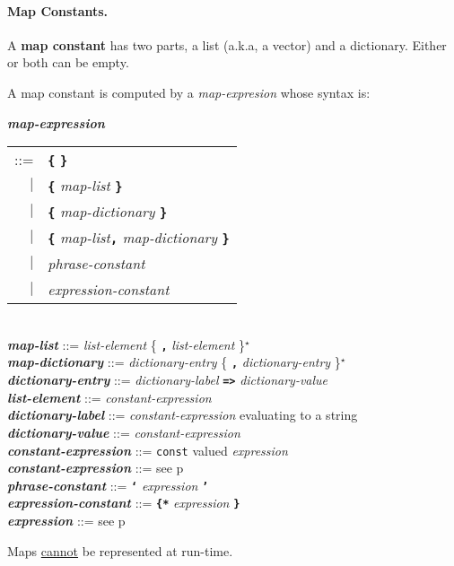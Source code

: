 \documentclass[12pt]{article}
\newcommand{\subsubsubsection}[1]{\paragraph[#1]{#1.}}
\newcommand{\TT}[1]{{\tt \bfseries #1}}
\newcommand{\STAR}{{\Large $^\star$}}
\newcommand{\key}[1]{{\rm \bfseries #1}}
\newcommand{\emkey}[1]{{\em \bfseries #1}}
\newcommand{\pagref}[1]{p\pageref{#1}}
\newenvironment{indpar}[1][0.3in]%
	{\begin{list}{}%
		     {\setlength{\itemsep}{0in}%
		      \setlength{\topsep}{0in}%
		      \setlength{\parsep}{1ex}%
		      \setlength{\labelwidth}{#1}%
		      \setlength{\leftmargin}{#1}%
		      \addtolength{\leftmargin}{\labelsep}}%
	 \item}%
	{\end{list}}
\begin{document}
\subsubsubsection{Map Constants}
\label{MAP-CONSTANTS}

A \key{map constant} has two parts, a list (a.k.a, a vector) and a dictionary.
Either or both can be empty.

A map constant is computed by a {\em map-expresion} whose syntax is:

\begin{indpar}
\emkey{map-expression}\label{MAP-EXPRESSION}
    \begin{tabular}[t]{rl}
    ::= & \TT{\{} \TT{\}} \\
    $|$ & \TT{\{} {\em map-list} \TT{\}} \\
    $|$ & \TT{\{} {\em map-dictionary} \TT{\}} \\
    $|$ & \TT{\{} {\em map-list}\TT{,} {\em map-dictionary} \TT{\}} \\
    $|$ & {\em phrase-constant} \\
    $|$ & {\em expression-constant} \\
    \end{tabular}
\\[0.5ex]
\emkey{map-list} ::= {\em list-element} \{ \TT{,} {\em list-element} \}\STAR{}
\\[0.5ex]
\emkey{map-dictionary} ::= {\em dictionary-entry}
                              \{ \TT{,} {\em dictionary-entry} \}\STAR{}
\\[0.5ex]
\emkey{dictionary-entry} ::=
    {\em dictionary-label} \TT{=>} {\em dictionary-value}
\\[0.5ex]
\emkey{list-element}\label{LIST-ELEMENT} ::= {\em constant-expression}
\\[0.5ex]
\emkey{dictionary-label}\label{DICTIONARY-LABEL}
    ::= {\em constant-expression} evaluating to a string
\\[0.5ex]
\emkey{dictionary-value}\label{DICTIONARY-VALUE}
    ::= {\em constant-expression}
\\[0.5ex]
\emkey{constant-expression}
    ::= {\tt const} valued {\em expression}
\\[0.5ex]
\emkey{constant-expression} ::= see \pagref{EXPRESSION}
\\[0.5ex]
\emkey{phrase-constant} ::= \TT{`} {\em expression} \TT{'}
\\[0.5ex]
\emkey{expression-constant} ::= \TT{\{*} {\em expression} \TT{*\}}
\\[0.5ex]
\emkey{expression} ::= see \pagref{EXPRESSION}
\end{indpar}

Maps \underline{cannot} be represented at run-time.
\end{document}

